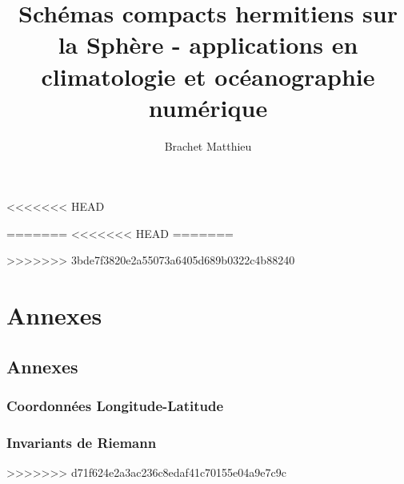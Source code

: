 \documentclass[10pt,a4paper]{book}
\author{Brachet Matthieu}
\title{Schémas compacts hermitiens sur la Sphère - applications en climatologie et océanographie numérique}
\begin{document}
\maketitle
\tableofcontents
\listoffigures
\listoftables

%
%




<<<<<<< HEAD
 



=======
% 
%
%
%
<<<<<<< HEAD
%
%
%
=======

>>>>>>> 3bde7f3820e2a55073a6405d689b0322c4b88240
\part{Annexes}
\chapter{Annexes} 
\section{Coordonnées Longitude-Latitude}

\section{Invariants de Riemann}

>>>>>>> d71f624e2a3ac236c8edaf41c70155e04a9e7c9c



\end{document}
